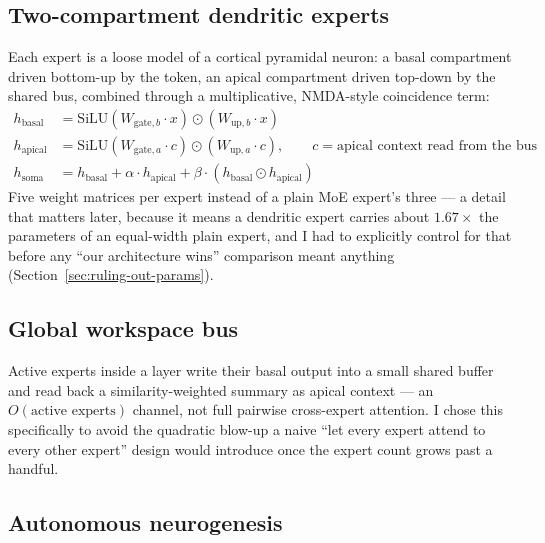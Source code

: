 \documentclass[11pt,letterpaper]{article}
\begin{document}
\subsection{Two-compartment dendritic experts}

Each expert is a loose model of a cortical pyramidal neuron: a basal compartment driven bottom-up by the token, an apical compartment driven top-down by the shared bus, combined through a multiplicative, NMDA-style coincidence term:
\begin{align}
h_{\text{basal}}  &= \mathrm{SiLU}(W_{\text{gate},b} \cdot x) \odot (W_{\text{up},b} \cdot x) \\
h_{\text{apical}} &= \mathrm{SiLU}(W_{\text{gate},a} \cdot c) \odot (W_{\text{up},a} \cdot c), \qquad c = \text{apical context read from the bus} \\
h_{\text{soma}}   &= h_{\text{basal}} + \alpha \cdot h_{\text{apical}} + \beta \cdot (h_{\text{basal}} \odot h_{\text{apical}})
\end{align}
Five weight matrices per expert instead of a plain MoE expert's three --- a detail that matters later, because it means a dendritic expert carries about $1.67\times$ the parameters of an equal-width plain expert, and I had to explicitly control for that before any ``our architecture wins'' comparison meant anything (Section~\ref{sec:ruling-out-params}).

\subsection{Global workspace bus}

Active experts inside a layer write their basal output into a small shared buffer and read back a similarity-weighted summary as apical context --- an $O(\text{active experts})$ channel, not full pairwise cross-expert attention. I chose this specifically to avoid the quadratic blow-up a naive ``let every expert attend to every other expert'' design would introduce once the expert count grows past a handful.

\subsection{Autonomous neurogenesis}
\end{document}
